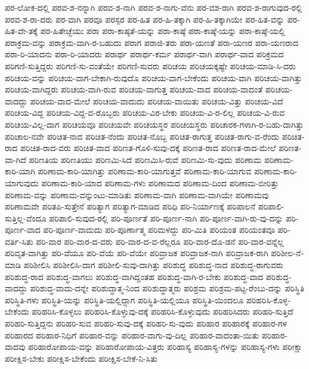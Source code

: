 {ಪರ-ಲೋಕ-ದಲ್ಲಿ
ಪರವ-ಶ-ನನ್ನಾಗಿ
ಪರವ-ಶ-ನಾಗಿ
ಪರವ-ಶ-ನಾಗು-ವೆನು
ಪರ-ವಶ-ರಾಗಿ
ಪರವ-ಶ-ರಾಗುವುದ-ರಲ್ಲಿ
ಪರವ-ಶ-ರಾ-ದರು
ಪರ-ವಾಗಿ
ಪರವೂ
ಪರಸ್ಪರ
ಪರ-ಹಿತ
ಪರ-ಹಿ-ತಕ್ಕಾಗಿ
ಪರ-ಹಿ-ತಕ್ಕಾಗಿಯೇ
ಪರ-ಹಿತ-ವನ್ನು
ಪರ-ಹಿತ-ವೇ-ತಕ್ಕೆ
ಪರ-ಹಿತೇಚ್ಛೆಯು
ಪರಾ
ಪರಾ-ಕಾಷ್ಠತೆ-ಯನ್ನು
ಪರಾ-ಕಾಷ್ಠೆ
ಪರಾ-ಕಾಷ್ಠೆ-ಯನ್ನು
ಪರಾ-ಕಾಷ್ಠೆ-ಯಲ್ಲಿ
ಪರಾಕ್ರಮ-ವನ್ನು
ಪರಾಕ್ರಮ-ವಾಗಿ-ರ-ಬಹುದು
ಪರಾಗ
ಪರಾಜಿ-ತರು
ಪರಾ-ಯಣತೆ
ಪರಾ-ಯಣರ
ಪರಾ-ಯಣರಾದ
ಪರಾ-ರಿ-ಯಾದನು
ಪರಾ-ರಿ-ಯಾದರು
ಪರಾರ್ಥ
ಪರಾರ್ಥ-ಕರ್ಮ
ಪರಾರ್ಥ-ವಾಗಿ
ಪರಾರ್ಥ-ವಾದ
ಪರಿಕ್ರಮದ
ಪರಿಗಣಿ-ಸುತ್ತಿದ್ದರು
ಪರಿಗಣಿ-ಸು-ವಂತೆಯೇ
ಪರಿಗಣಿ-ಸುವರು
ಪರಿಚಯ
ಪರಿಚಯಕ್ಕಷ್ಟೇ
ಪರಿಚಯ-ಮಾಡಿ-ಸಿ-ದರು
ಪರಿಚಯ-ವನ್ನು
ಪರಿಚಯ-ವಾಗ-ಬೇಕಾಗಿ-ರುವುದೊ
ಪರಿಚಯ-ವಾಗ-ಬೇಕೆಂದು
ಪರಿಚಯ-ವಾಗಿ
ಪರಿಚಯ-ವಾಗಿತ್ತು
ಪರಿಚಯ-ವಾಗಿದ್ದರು
ಪರಿಚಯ-ವಾಗಿ-ರುವ
ಪರಿಚಯ-ವಾಗುತ್ತ
ಪರಿಚಯ-ವಾದ
ಪರಿಚಯ-ವಾದಂತೆ
ಪರಿಚಯ-ವಾದದ್ದು
ಪರಿಚಯ-ವಾದ-ಮೇಲೆ
ಪರಿಚಯ-ವಾದುದು
ಪರಿಚಯ-ವಾಯಿತು
ಪರಿಚಯ-ವಿತ್ತು
ಪರಿಚಯ-ವಿದೆ
ಪರಿಚಯ-ವಿದ್ದ
ಪರಿಚಯ-ವಿದ್ದ-ವ-ರೊಬ್ಬರು
ಪರಿಚಯ-ವಿರ-ಬೇಕು
ಪರಿಚಯ-ವಿ-ರ-ಲಿಲ್ಲ
ಪರಿಚಯ-ವಿ-ರುವ
ಪರಿಚಯ-ವಿಲ್ಲ-ದಾಗ
ಪರಿಚಯವೂ
ಪರಿಚಯವೇ
ಪರಿಚಯಸ್ಥರ
ಪರಿಚಯಸ್ಥರು
ಪರಿಚಾರಕ-ಗಳಾಗಿ-ರ-ಬಹು-ದಾಗಿತ್ತು
ಪರಿಚಾಲ-ನವೇ
ಪರಿಚಿತ-ನಾದ
ಪರಿಚಿತ-ನೆಂದು
ಪರಿಚಿತ-ನೊಬ್ಬ
ಪರಿಚಿತ-ರಾಗುತ್ತ
ಪರಿಚಿತ-ರಾಗು-ವ-ರೆಂದು
ಪರಿಚಿತ-ರಾದ
ಪರಿಚಿತ-ರಾದ-ವರು
ಪರಿಚಿತ-ವಾದ
ಪರಿಣತ-ಗೊಳಿ-ಸುವು-ದಕ್ಕೆ
ಪರಿಣತ-ರಾದ
ಪರಿಣತ-ರಾದ-ಮೇಲೆ
ಪರಿಣತ-ವಾ-ಗಿದೆ
ಪರಿಣತಿಯ
ಪರಿಣತಿಯು
ಪರಿಣಮಿ-ಸಿದೆ
ಪರಿಣಮಿಸಿ-ರುವೆ
ಪರಿಣಮಿ-ಸು-ವುದು
ಪರಿಣಾಮ
ಪರಿಣಾಮ-ಕಾರಿ-ಯಾಗಿ
ಪರಿಣಾಮ-ಕಾರಿ-ಯಾಗಿತ್ತು
ಪರಿಣಾಮ-ಕಾರಿ-ಯಾಗುತ್ತವೆ
ಪರಿಣಾಮ-ಕಾರಿ-ಯಾಗುವ
ಪರಿಣಾಮ-ಕಾರಿ-ಯಾಗುವುದು
ಪರಿಣಾಮ-ಕಾರಿ-ಯಾದ
ಪರಿಣಾಮ-ಗಳು
ಪರಿಣಾಮದ
ಪರಿಣಾಮ-ದಿಂದ
ಪರಿಣಾಮ-ಬೀರಿತ್ತು
ಪರಿಣಾಮ-ವನ್ನು
ಪರಿಣಾಮ-ವನ್ನುಂಟು-ಮಾಡಿತು
ಪರಿಣಾಮ-ವಾಗಿ
ಪರಿಣಾಮ-ವಾಗಿಯೇ
ಪರಿಣಾಮವು
ಪರಿಣಾಮವೇ
ಪರಿತಪಿ-ಸುತ್ತೇನೆ
ಪರಿತ್ಯಾಗ
ಪರಿತ್ಯಾಗ-ಮಾಡಿದ
ಪರಿಧಿ
ಪರಿ-ನಿರ್ಯಾಣಕ್ಕೆ
ಪರಿಪಾಲನೆ
ಪರಿಪಾಲಿ-ಸುತ್ತಿಲ್ಲ-ವೆಂದೂ
ಪರಿಪಾಲಿ-ಸುವುದ-ರಲ್ಲಿ
ಪರಿ-ಪೂರ್ಣತೆ
ಪರಿ-ಪೂರ್ಣ-ನಾಗಿ
ಪರಿ-ಪೂರ್ಣ-ವಾಗಿ-ರು-ವು-ದನ್ನು
ಪರಿ-ಪೂರ್ಣ-ವಾದ
ಪರಿ-ಪೂರ್ಣ-ವಾದುದು
ಪರಿ-ಪೂರ್ಣಾತ್ಮ
ಪರಿಮಳದ್ದು
ಪರಿ-ಮಿತಿ
ಪರಿಯಂತ
ಪರಿಯಂತವೂ
ಪರಿ-ವರ್ತಿ-ಸಿತು
ಪರಿ-ವಾರ
ಪರಿ-ವಾರ-ದ-ವರು
ಪರಿ-ವಾರ-ದ-ವ-ರೆಲ್ಲರೂ
ಪರಿ-ವಾರ-ದೊ-ಡನೆ
ಪರಿ-ವಾರ-ವನ್ನೆಲ್ಲ
ಪರಿವೃತ-ವಾಗಿತ್ತು
ಪರಿ-ವೆಯೂ
ಪರಿ-ವೆಯೆ
ಪರಿ-ವೆಯೇ
ಪರಿವ್ರಾಜಕ
ಪರಿವ್ರಾಜಕ-ನಾಗಿ
ಪರಿವ್ರಾಜಕ-ರಾಗಿ
ಪರಿಶೀಲ-ನೆ-ಮಾಡಿ
ಪರಿಶೀಲಿಸಿ
ಪರಿಶೀಲಿಸಿ-ದಾಗ
ಪರಿಶೀಲಿ-ಸುವು-ದಾಗಿತ್ತು
ಪರಿಶುದ್ಧ
ಪರಿಶುದ್ಧ-ನಾದ
ಪರಿಶುದ್ಧ-ರಾಗುವರು
ಪರಿಶುದ್ಧ-ರಾದ
ಪರಿಶುದ್ಧ-ವಾಗಲು
ಪರಿಶುದ್ಧ-ವಾಗಿದ್ದಂತಹ
ಪರಿಶುದ್ಧ-ವಾಗಿ-ರ-ಬೇಕು
ಪರಿಶುದ್ಧ-ವಾದ
ಪರಿಶುದ್ಧ-ವಾದದ್ದು
ಪರಿಶುದ್ಧ-ವಾದು-ದನ್ನೇ
ಪರಿಶುದ್ಧಾತ್ಮ-ನಿಂದ
ಪರಿಶುದ್ಧಾತ್ಮರು
ಪರಿಶ್ರಮ
ಪರಿಶ್ರಮ-ಪಟ್ಟ-ರೆಂಬು-ದನ್ನು
ಪರಿಸ್ಥಿತಿ
ಪರಿಸ್ಥಿತಿ-ಗಳು
ಪರಿಸ್ಥಿತಿ-ಯನ್ನು
ಪರಿಸ್ಥಿತಿ-ಯಲ್ಲಿದ್ದಾಗ
ಪರಿಸ್ಥಿತಿ-ಯಲ್ಲಿಯೂ
ಪರಿಸ್ಥಿತಿ-ಯಿಂದಲೂ
ಪರಿಹರಿಸಿ-ಕೊಳ್ಳ-ಬೇಕೆಂದು
ಪರಿಹರಿಸಿ-ಕೊಳ್ಳಲು
ಪರಿಹರಿಸಿ-ಕೊಳ್ಳುವು-ದಕ್ಕೆ
ಪರಿಹರಿಸಿ-ಕೊಳ್ಳುವುದು
ಪರಿಹರಿಸಿದರು
ಪರಿಹರಿ-ಸುತ್ತಿದೆ
ಪರಿಹರಿ-ಸುತ್ತಿದ್ದನು
ಪರಿಹರಿ-ಸುವ
ಪರಿಹರಿ-ಸುವು-ದಕ್ಕೆ
ಪರಿಹರಿ-ಸು-ವುದು
ಪರಿಹಾರ
ಪರಿಹಾರಕ್ಕೆ
ಪರಿಹಾರ-ಗಳ
ಪರಿಹಾರದ
ಪರಿಹಾರ-ನಿಧಿಗೆ
ಪರಿಹಾರ-ವನ್ನು
ಪರಿಹಾರ-ವಾಗು-ವು-ದಿಲ್ಲ
ಪರಿಹಾರ-ವಾದಂತಾ-ಯಿತು
ಪರಿಹಾರ-ವಾದವು
ಪರಿಹಾರೋಪಾಯ-ವನ್ನು
ಪರಿಹಾರೋಪಾಯ-ವಿತ್ತರು
ಪರಿಹಾಸ್ಯ
ಪರಿಹಾಸ್ಯ-ಗಳನ್ನು
ಪರಿಹಾಸ್ಯ-ಗಳು
ಪರೀಕ್ಷಾ
ಪರೀಕ್ಷಿಸ-ಬೇಕು
ಪರೀಕ್ಷಿಸ-ಬೇಕೆಂದು
ಪರೀಕ್ಷಿಸ-ಬೇಕೆ-ನಿ-ಸಿತು
}
